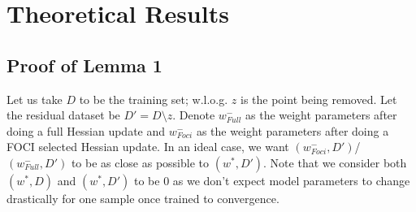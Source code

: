 \section{Theoretical Results}\label{app:5:proofs}
\subsection{Proof of Lemma 1}
Let us take $D$ to be the training set; w.l.o.g. $z$ is the point being removed. Let the residual dataset be $D' = D \setminus {z}$.
Denote $w^-_{Full}$ as the weight parameters after doing a full Hessian update and $w^-_{Foci}$ as the weight parameters after doing a FOCI selected Hessian update.
In an ideal case, we want $(w^-_{Foci}, D')$/$(w^-_{Full}, D')$ to be as close as possible to $(w^*, D')$. Note that we consider both $(w^*, D)$ and $(w^*, D')$ to be $0$ as we don't expect model parameters to change drastically for one sample once trained to convergence. 


